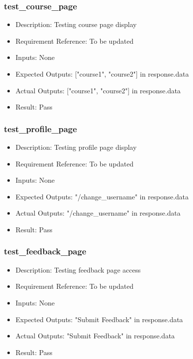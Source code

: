 \documentclass[12pt, titlepage]{article}
\begin{document}
\subsubsection{test\_course\_page}\label{3.1.7}
\begin{itemize}
    \item Description: Testing course page display
    \item Requirement Reference: To be updated
    \item Inputs: None
    \item Expected Outputs: ["course1", "course2"] in response.data
    \item Actual Outputs: ["course1", "course2"] in response.data
    \item Result: Pass
\end{itemize}
\subsubsection{test\_profile\_page}\label{3.1.8}
\begin{itemize}
    \item Description: Testing profile page display
    \item Requirement Reference: To be updated
    \item Inputs: None
    \item Expected Outputs: "/change\_username" in response.data
    \item Actual Outputs: "/change\_username" in response.data
    \item Result: Pass
\end{itemize}
\subsubsection{test\_feedback\_page}\label{3.1.9}
\begin{itemize}
    \item Description: Testing feedback page access
    \item Requirement Reference: To be updated
    \item Inputs: None
    \item Expected Outputs: "Submit Feedback" in response.data
    \item Actual Outputs: "Submit Feedback" in response.data
    \item Result: Pass
\end{itemize}
\end{document}
